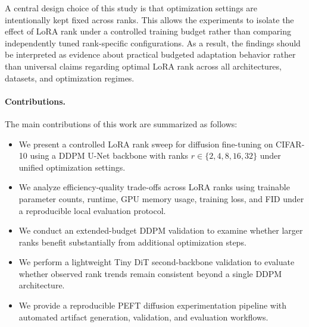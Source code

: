 A central design choice of this study is that optimization settings are intentionally kept fixed across ranks. This allows the experiments to isolate the effect of LoRA rank under a controlled training budget rather than comparing independently tuned rank-specific configurations. As a result, the findings should be interpreted as evidence about practical budgeted adaptation behavior rather than universal claims regarding optimal LoRA rank across all architectures, datasets, and optimization regimes.

\paragraph{Contributions.}
The main contributions of this work are summarized as follows:

\begin{itemize}
    \item We present a controlled LoRA rank sweep for diffusion fine-tuning on CIFAR-10 using a DDPM U-Net backbone with ranks $r \in \{2,4,8,16,32\}$ under unified optimization settings.

    \item We analyze efficiency-quality trade-offs across LoRA ranks using trainable parameter counts, runtime, GPU memory usage, training loss, and FID under a reproducible local evaluation protocol.

    \item We conduct an extended-budget DDPM validation to examine whether larger ranks benefit substantially from additional optimization steps.

    \item We perform a lightweight Tiny DiT second-backbone validation to evaluate whether observed rank trends remain consistent beyond a single DDPM architecture.

    \item We provide a reproducible PEFT diffusion experimentation pipeline with automated artifact generation, validation, and evaluation workflows.
\end{itemize}